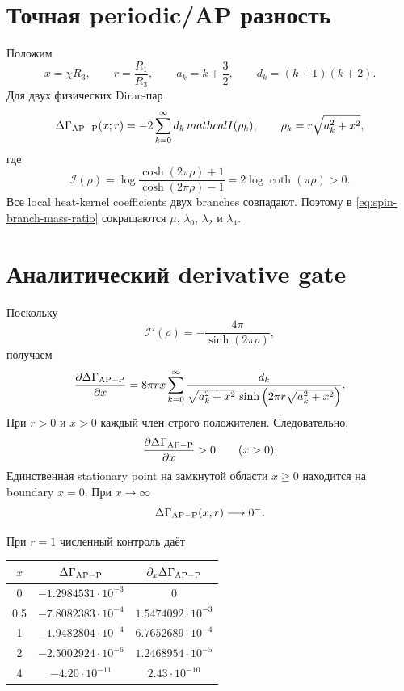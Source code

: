 \section{Точная periodic/AP разность}

Положим
\begin{equation}
 x=\chi R_3,
 \qquad
 r=\frac{R_1}{R_3},
 \qquad
 a_k=k+\frac32,
 \qquad
 d_k=(k+1)(k+2).
\end{equation}
Для двух физических Dirac-пар
\begin{equation}
 \Delta\Gamma_{\rm AP-P}(x;r)
 =-2\sum_{k=0}^\infty d_k\,mathcal I(\rho_k),
 \qquad
 \rho_k=r\sqrt{a_k^2+x^2},
 \label{eq:spin-branch-mass-ratio}
\end{equation}
где
\begin{equation}
 \mathcal I(\rho)
 =\log\frac{\cosh(2\pi\rho)+1}{\cosh(2\pi\rho)-1}
 =2\log\coth(\pi\rho)>0.
\end{equation}
Все local heat-kernel coefficients двух branches совпадают. Поэтому в
\eqref{eq:spin-branch-mass-ratio} сокращаются \(\mu\), \(\lambda_0\),
\(\lambda_2\) и \(\lambda_4\).

\section{Аналитический derivative gate}

Поскольку
\begin{equation}
 \mathcal I'(\rho)
 =-\frac{4\pi}{\sinh(2\pi\rho)},
\end{equation}
получаем
\begin{equation}
 \frac{\partial\Delta\Gamma_{\rm AP-P}}{\partial x}
 =8\pi r x
 \sum_{k=0}^\infty
 \frac{d_k}
 {\sqrt{a_k^2+x^2}\,
  \sinh\left(2\pi r\sqrt{a_k^2+x^2}\right)}.
 \label{eq:spin-branch-positive-derivative}
\end{equation}
При \(r>0\) и \(x>0\) каждый член строго положителен. Следовательно,
\begin{equation}
 \frac{\partial\Delta\Gamma_{\rm AP-P}}{\partial x}>0
 \qquad(x>0).
\end{equation}
Единственная stationary point на замкнутой области \(x\ge0\) находится на
boundary \(x=0\). При \(x\to\infty\)
\begin{equation}
 \Delta\Gamma_{\rm AP-P}(x;r)\longrightarrow0^{-}.
\end{equation}

При \(r=1\) численный контроль даёт
\begin{center}
\begin{tabular}{ccc}
\toprule
\(x\) & \(\Delta\Gamma_{\rm AP-P}\) &
\(\partial_x\Delta\Gamma_{\rm AP-P}\) \\
\midrule
0 & \(-1.2984531\cdot10^{-3}\) & 0 \\
0.5 & \(-7.8082383\cdot10^{-4}\) & \(1.5474092\cdot10^{-3}\) \\
1 & \(-1.9482804\cdot10^{-4}\) & \(6.7652689\cdot10^{-4}\) \\
2 & \(-2.5002924\cdot10^{-6}\) & \(1.2468954\cdot10^{-5}\) \\
4 & \(-4.20\cdot10^{-11}\) & \(2.43\cdot10^{-10}\) \\
\bottomrule
\end{tabular}
\end{center}

